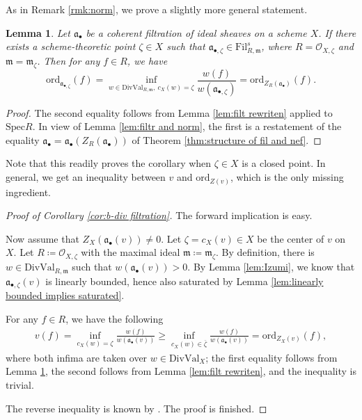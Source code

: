 \documentclass[11pt, leqno]{amsart}%
\theoremstyle{plain}
\newtheorem{lemma}[theorem]{Lemma}
\theoremstyle{definition}
\theoremstyle{remark}
\newcommand{\cO}{\mathcal{O}}
\newcommand{\fa}{\mathfrak{a}}
\newcommand{\fm}{\mathfrak{m}}
\newcommand{\ord}{\mathrm{ord}}
\newcommand{\DivVal}{\mathrm{DivVal}}
\newcommand{\Spec}{\mathrm{Spec}}
\newcommand{\Fil}{\mathrm{Fil}}
\begin{document}
As in Remark \ref{rmk:norm}, we prove a slightly more general statement.

\begin{lemma}\label{lem:saturated norm}
    Let $\fa_\bullet$ be a coherent filtration of ideal sheaves on a scheme $X$. If there exists a scheme-theoretic point $\zeta\in X$ such that $\fa_{\bullet,\zeta}\in\Fil^s_{R,\fm}$, where $R=\cO_{X,\zeta}$ and $\fm=\fm_\zeta$.
    Then for any $f\in R$, we have
    \[
        \ord_{\fa_{\bullet,\zeta}}(f)=\inf_{w\in\DivVal_{R,\fm},~ c_X(w)=\zeta} \frac{w(f)}{w(\fa_{\bullet,\zeta})}=\ord_{Z_R(\fa_\bullet)}(f). 
    \]
\end{lemma}

\begin{proof}
    The second equality follows from Lemma \ref{lem:filt rewriten} applied to $\Spec R$. 
    In view of Lemma \ref{lem:filtr and norm}, the first is a restatement of the equality $\fa_\bullet=\fa_\bullet(Z_R(\fa_\bullet))$ of Theorem \ref{thm:structure of fil and nef}.
\end{proof}

Note that this readily proves the corollary when $\zeta\in X$ is a closed point. In general, we get an inequality between $v$ and $\ord_{Z(v)}$, which is the only missing ingredient. 

\begin{proof}[Proof of Corollary \ref{cor:b-div filtration}]
    The forward implication is easy. 
        
    Now assume that $Z_X(\fa_\bullet(v))\ne 0$.
    Let $\zeta=c_X(v)\in X$ be the center of $v$ on $X$. Let $R\coloneqq \cO_{X,\zeta}$ with the maximal ideal $\fm\coloneqq\fm_\zeta$. 
    By definition, there is $w\in\DivVal_{R,\fm}$ such that $w(\fa_\bullet(v))>0$. 
    By Lemma \ref{lem:Izumi}, we know that $\fa_{\bullet,\zeta}(v)$ is linearly bounded, hence also saturated by Lemma \ref{lem:linearly bounded implies saturated}. 
        
    For any $f\in R$, we have the following 
    \begin{align}\label{eqn:main}
        v(f)=\inf_{c_X(w)=\zeta} \frac{w(f)}{w(\fa_\bullet(v))}\ge
            \inf_{c_X(w)\in \overline{\zeta}} \frac{w(f)}{w(\fa_\bullet(v))}=
            \ord_{Z_X(v)}(f),
    \end{align}
    where both infima are taken over $w\in\DivVal_X$; the first equality follows from Lemma \ref{lem:saturated norm}, the second follows from Lemma \ref{lem:filt rewriten}, and the inequality is trivial.

    The reverse inequality is known by \cite[Proposition 3.15]{RU-b-div}. 
    The proof is finished.
\end{proof}
\end{document}
